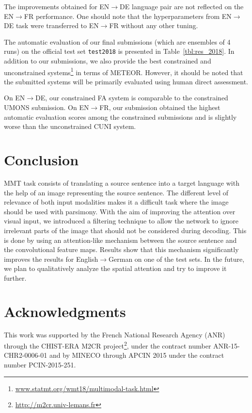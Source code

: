 \documentclass[11pt,a4paper]{article}
\newcommand{\tm}[1] {\texttt{#1}}
\newcommand{\ra}{$\rightarrow$}
\begin{document}
The improvements obtained for EN\ra DE language pair are not reflected on the EN\ra FR performance.
One should note that the hyperparameters from EN\ra DE task were transferred to EN\ra FR without
any other tuning.

The automatic evaluation of our final submissions (which are ensembles of 4 runs) on the official test set \tm{test2018} is
presented in Table~\ref{tbl:res_2018}. In addition to our submissions, we also provide the best constrained and unconstrained
systems\footnote{\url{www.statmt.org/wmt18/multimodal-task.html}} in terms of METEOR. However, it should be noted that the submitted systems will be primarily evaluated using
human direct assessment.

On EN\ra DE, our constrained FA system is comparable to the constrained UMONS submission. On EN\ra FR,
our submission obtained the highest automatic evaluation scores among the constrained submissions
and is slightly worse than the unconstrained CUNI system.

\section{Conclusion}
\label{sec:conclusion}
MMT task consists of translating a source sentence into a target language with the help of an image representing the source sentence.
The different level of relevance of both input modalities makes it a difficult task where the image should be used with parsimony.
With the aim of improving the attention over visual input, we introduced a filtering technique to allow the network to ignore irrelevant parts of the image that should not be considered during decoding. This is done by using an attention-like mechanism between the source sentence and the convolutional feature maps. Results show that this mechanism significantly improves the results for English\ra German on one of the test sets.
In the future, we plan to qualitatively analyze the spatial attention and try to improve it further.

\section*{Acknowledgments}
This work was supported by the French National Research Agency (ANR) through the CHIST-ERA M2CR project\footnote{\url{http://m2cr.univ-lemans.fr}}, under the contract number ANR-15-CHR2-0006-01 and by MINECO through APCIN 2015 under the contract number PCIN-2015-251.



\end{document}
